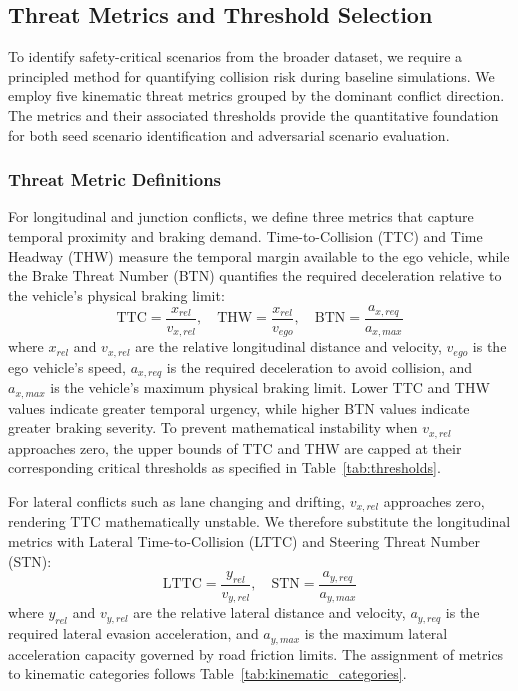 \subsection{Threat Metrics and Threshold Selection}
\label{sec:threshold_selection}
To identify safety-critical scenarios from the broader dataset, we require a principled method for quantifying collision risk during baseline simulations. We employ five kinematic threat metrics grouped by the dominant conflict direction. The metrics and their associated thresholds provide the quantitative foundation for both seed scenario identification and adversarial scenario evaluation.
\subsubsection{Threat Metric Definitions}
\label{sec:threat_metrics}

For longitudinal and junction conflicts, we define three metrics that capture temporal proximity and braking demand. Time-to-Collision (TTC) and Time Headway (THW) measure the temporal margin available to the ego vehicle, while the Brake Threat Number (BTN) quantifies the required deceleration relative to the vehicle's physical braking limit:
\begin{equation}
    \text{TTC} = \frac{x_{rel}}{v_{x, rel}}, \quad \text{THW} = \frac{x_{rel}}{v_{ego}}, \quad \text{BTN} = \frac{a_{x, req}}{a_{x, max}}
\end{equation}
where $x_{rel}$ and $v_{x, rel}$ are the relative longitudinal distance and velocity, $v_{ego}$ is the ego vehicle's speed, $a_{x, req}$ is the required deceleration to avoid collision, and $a_{x, max}$ is the vehicle's maximum physical braking limit. Lower TTC and THW values indicate greater temporal urgency, while higher BTN values indicate greater braking severity. To prevent mathematical instability when $v_{x, rel}$ approaches zero, the upper bounds of TTC and THW are capped at their corresponding critical thresholds as specified in Table~\ref{tab:thresholds}.

For lateral conflicts such as lane changing and drifting, $v_{x, rel}$ approaches zero, rendering TTC mathematically unstable. We therefore substitute the longitudinal metrics with Lateral Time-to-Collision (LTTC) and Steering Threat Number (STN):
\begin{equation}
    \text{LTTC} = \frac{y_{rel}}{v_{y, rel}}, \quad \text{STN} = \frac{a_{y, req}}{a_{y, max}}
\end{equation}
where $y_{rel}$ and $v_{y, rel}$ are the relative lateral distance and velocity, $a_{y, req}$ is the required lateral evasion acceleration, and $a_{y, max}$ is the maximum lateral acceleration capacity governed by road friction limits. The assignment of metrics to kinematic categories follows Table~\ref{tab:kinematic_categories}.

